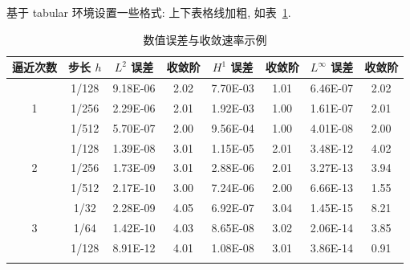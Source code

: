 \documentclass[zihao=-4]{ctexart}
\numberwithin{equation}{section}
\numberwithin{figure}{section}
\numberwithin{table}{section}
\theoremstyle{plain}
\begin{document}
基于 tabular 环境设置一些格式: 上下表格线加粗, 如表~\ref{tab:error}.
\begin{table}[htp!]
\centering
\caption{数值误差与收敛速率示例}
\label{tab:error}
\begin{tabular}{c|c|cc|cc|cc}
\Xhline{2\arrayrulewidth}
逼近次数 & 步长 $h$ & $L^2$ 误差 & 收敛阶 & $H^1$ 误差 & 收敛阶 & $L^\infty$ 误差 & 收敛阶 \\
\hline
  & 1/128 & 9.18E-06 & 2.02 & 7.70E-03 & 1.01  & 6.46E-07 & 2.02 \\
1 & 1/256 & 2.29E-06 & 2.01 & 1.92E-03 & 1.00  & 1.61E-07 & 2.01 \\
  & 1/512 & 5.70E-07 & 2.00 & 9.56E-04 & 1.00  & 4.01E-08 & 2.00 \\
\hline
  & 1/128 & 1.39E-08 & 3.01 & 1.15E-05 & 2.01  & 3.48E-12 & 4.02 \\
2 & 1/256 & 1.73E-09 & 3.01 & 2.88E-06 & 2.01  & 3.27E-13 & 3.94 \\
  & 1/512 & 2.17E-10 & 3.00 & 7.24E-06 & 2.00  & 6.66E-13 & 1.55 \\
\hline
  & 1/32  & 2.28E-09 & 4.05 & 6.92E-07 & 3.04  & 1.45E-15 & 8.21 \\
3 & 1/64  & 1.42E-10 & 4.03 & 8.65E-08 & 3.02  & 2.06E-14 & 3.85 \\
  & 1/128 & 8.91E-12 & 4.01 & 1.08E-08 & 3.01  & 3.86E-14 & 0.91 \\
\Xhline{2\arrayrulewidth}
\end{tabular}
\end{table}



\clearpage
{}
{}








%
%
%
%
%
\end{document}
